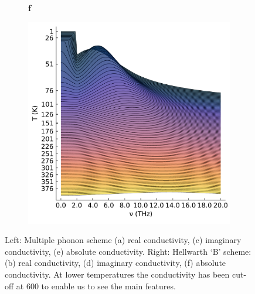 \begin{figure}
{\begin{subfigure}[b]{.58\textwidth}
\end{subfigure}%
\begin{subfigure}[t]{0.01\textwidth}
    \vspace*{-7.5cm}\textbf{f}
  \end{subfigure}%
\begin{subfigure}[b]{.58\textwidth}
\centering
\includegraphics[width=.88\textwidth]{chapters/frohlich/figures/B_plot_temp_abs.pdf}
\end{subfigure}%
}
\caption{Left: Multiple phonon scheme (a) real conductivity, (c) imaginary conductivity, (e) absolute conductivity. Right: Hellwarth `B' scheme: (b) real conductivity, (d) imaginary conductivity, (f) absolute conductivity. At lower temperatures the conductivity has been cut-off at $600$ to enable us to see the main features.}
\label{fig:multiridge}
\end{figure}

\newpage


